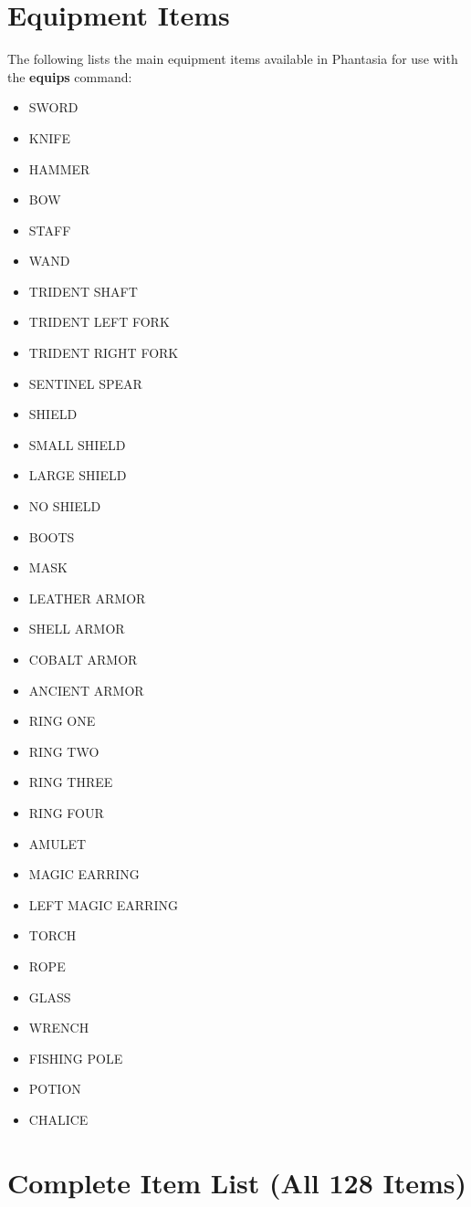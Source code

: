 \documentclass[11pt,letterpaper,oldstylefigures]{memoir}
\newcommand{\fountain}[1]{\textbf{#1}}
\newcommand{\Phantasia}{{\irishfont Phantasia}}
\begin{document}
\section{Equipment Items}

The following lists the main equipment items available in \Phantasia{} for use with the \fountain{equips} command:

\begin{itemize}
\item SWORD
\item KNIFE
\item HAMMER
\item BOW
\item STAFF
\item WAND
\item TRIDENT SHAFT
\item TRIDENT LEFT FORK
\item TRIDENT RIGHT FORK
\item SENTINEL SPEAR
\item SHIELD
\item SMALL SHIELD
\item LARGE SHIELD
\item NO SHIELD
\item BOOTS
\item MASK
\item LEATHER ARMOR
\item SHELL ARMOR
\item COBALT ARMOR
\item ANCIENT ARMOR
\item RING ONE
\item RING TWO
\item RING THREE
\item RING FOUR
\item AMULET
\item MAGIC EARRING
\item LEFT MAGIC EARRING
\item TORCH
\item ROPE
\item GLASS
\item WRENCH
\item FISHING POLE
\item POTION
\item CHALICE
\end{itemize}

\section{Complete Item List (All 128 Items)}
\end{document}
